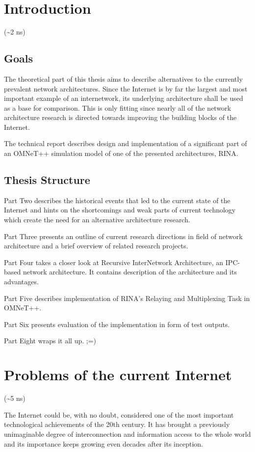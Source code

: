 
\chapter{Introduction}
    (\textasciitilde2 ns)
    \section{Goals}
        The theoretical part of this thesis aims to describe alternatives to the currently prevalent network architectures. Since the Internet is by far the largest and most important example of an internetwork, its underlying architecture shall be used as a base for comparison. This is only fitting since nearly all of the network architecture research is directed towards improving the building blocks of the Internet.

        The technical report describes design and implementation of a significant part of an OMNeT++ simulation model of one of the presented architectures, RINA.

    \section{Thesis Structure}

        Part Two describes the historical events that led to the current state of the Internet and hints on the shortcomings and weak parts of current technology which create the need for an alternative architecture research.

        Part Three presents an outline of current research directions in field of network architecture and a brief overview of related research projects.

        Part Four takes a closer look at Recursive InterNetwork Architecture, an IPC-based network architecture. It contains description of the architecture and its advantages.

        Part Five describes implementation of RINA's Relaying and Multiplexing Task in OMNeT++.

        Part Six presents evaluation of the implementation in form of test outputs.

        Part Eight wraps it all up. ;=)

\chapter{Problems of the current Internet}
    (\textasciitilde5 ns)

    The Internet could be, with no doubt, considered one of the most important technological achievements of the 20th century. It has brought a previously unimaginable degree of interconnection and information access to the whole world and its importance keeps growing even decades after its inception.


